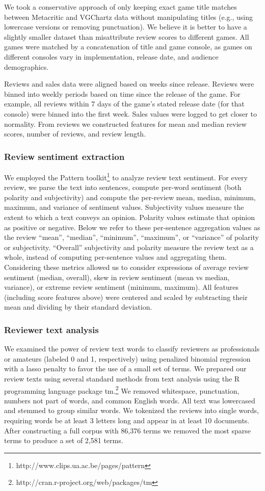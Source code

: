 \documentclass[letterpaper]{article}
\begin{document}
We took a conservative approach of only keeping exact game title matches
between Metacritic and VGChartz data without manipulating titles (e.g.,
using lowercase versions or removing punctuation). We believe it is better to have a slightly smaller dataset than misattribute review scores to different games. All games were matched by a concatenation of title and game console, as games on different consoles vary in implementation, release date, and audience demographics. 

Reviews and sales data were aligned based on weeks since release. Reviews were binned into weekly periods based on time since the release of the game. For example, all reviews within 7 days of the game's stated release date (for that console) were binned into the first week. Sales values were logged to get closer to normality. From reviews we constructed features for mean and median review scores, number of reviews, and review length.

\subsubsection{Review sentiment extraction}
We employed the Pattern toolkit\footnote{http://www.clips.ua.ac.be/pages/pattern} to analyze review text sentiment. For every review, we parse the text into sentences, compute per-word sentiment (both polarity and subjectivity) and compute the per-review mean, median, minimum, maximum, and variance of sentiment values. Subjectivity values measure the extent to which a text conveys an opinion. Polarity values estimate that opinion as positive or negative. Below we refer to these per-sentence aggregation values as the review ``mean'', ``median'', ``minimum'', ``maximum'', or ``variance'' of polarity or subjectivity. ``Overall'' subjectivity and polarity measure the review text as a whole, instead of computing per-sentence values and aggregating them. Considering these metrics allowed us to consider expressions of average review sentiment (median, overall), skew in review sentiment (mean vs median, variance), or extreme review sentiment (minimum, maximum). All features (including score features above) were centered and scaled by subtracting their mean and dividing by their standard deviation.

\subsubsection{Reviewer text analysis}
We examined the power of review text words to classify reviewers as professionals or amateurs (labeled 0 and 1, respectively) using penalized binomial regression with a lasso penalty to favor the use of a small set of terms.
We prepared our review texts using several standard methods from text analysis using the R programming language package tm.\footnote{http://cran.r-project.org/web/packages/tm} We removed whitespace, punctuation, numbers not part of words, and common English words. All text was lowercased and stemmed to group similar words. We tokenized the reviews into single words, requiring words be at least 3 letters long and appear in at least 10 documents. After constructing a full corpus with 86,376 terms we removed the most sparse terms to produce a set of 2,581 terms.
\end{document}
